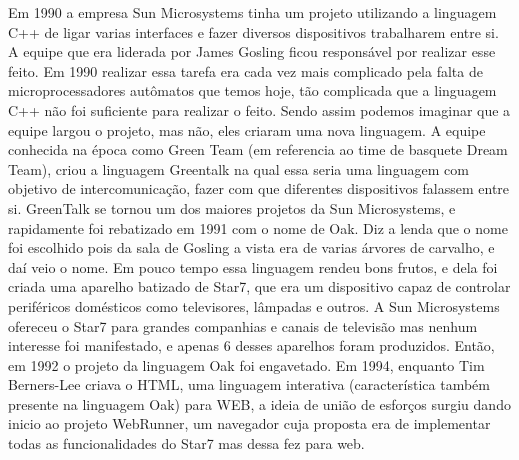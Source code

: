 \documentclass[
    12pt,               %
    openright,          %
    twoside,            %
    a4paper,            %
    brazil              %
    ]{abntex2}
\begin{document}
Em 1990 a empresa Sun Microsystems tinha um projeto utilizando a linguagem C++
de ligar varias interfaces e fazer diversos dispositivos trabalharem entre si.
A equipe que era liderada por James Gosling ficou responsável por realizar esse
feito. Em 1990 realizar essa tarefa era cada vez mais complicado pela falta de
microprocessadores autômatos que temos hoje, tão complicada que a linguagem C++
não foi suficiente para realizar o feito. Sendo assim podemos imaginar que a
equipe largou o projeto, mas não, eles criaram uma nova linguagem. A equipe
conhecida na época como Green Team (em referencia ao time de basquete Dream
Team), criou a linguagem Greentalk na qual essa seria uma linguagem com
objetivo de intercomunicação, fazer com que diferentes dispositivos falassem
entre si. GreenTalk se tornou um dos maiores projetos da Sun Microsystems, e
rapidamente foi rebatizado em 1991 com o nome de Oak. Diz a lenda que o nome
foi escolhido pois da sala de Gosling a vista era de varias árvores de
carvalho, e daí veio o nome. Em pouco tempo essa linguagem rendeu bons frutos,
e dela foi criada uma aparelho batizado de Star7, que era um dispositivo capaz de controlar periféricos domésticos
como televisores, lâmpadas e outros. A Sun Microsystems ofereceu o Star7 para grandes companhias e canais de televisão mas
nenhum interesse foi manifestado, e apenas 6 desses aparelhos foram produzidos. Então, em 1992 o projeto da linguagem Oak foi engavetado.
Em 1994, enquanto Tim Berners-Lee criava o HTML, uma linguagem interativa (característica também presente na linguagem Oak) para
WEB, a ideia de união de esforços surgiu dando inicio ao projeto WebRunner, um navegador cuja proposta era de implementar todas as funcionalidades do Star7 
mas dessa fez para web. 
\end{document}

